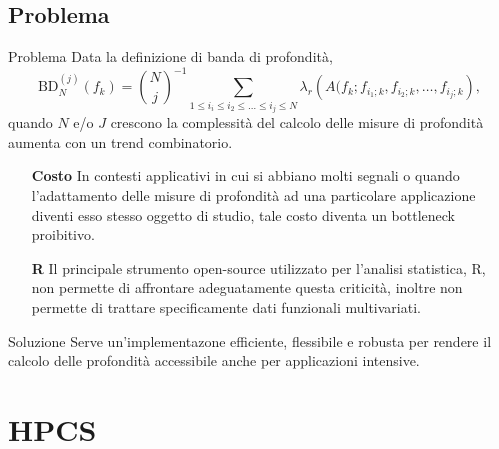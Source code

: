 \documentclass[9pt]{beamer}
\begin{document}
\subsection{Problema}
\begin{frame}

\begin{alertblock}{Problema}
Data la definizione di banda di profondit\`a,
\[
\text{BD}^{(j)}_N(f_k) = {N \choose j}^{-1} \sum_{1 \leq i_i \leq i_2 \leq \ldots \leq i_j \leq N } \lambda_r \left( A(f_k; f_{i_1;k}, f_{i_2;k}, \ldots, f_{i_j;k} \right),
\]
quando $N$ e/o $J$ crescono la complessit\`a del calcolo delle misure di profondit\`a
aumenta con un trend combinatorio.
\end{alertblock}

\begin{itemize}
 \item[\textbf{Costo}] In contesti applicativi in cui si abbiano molti segnali
	  o quando l’adattamento delle misure di profondità ad una particolare applicazione diventi esso stesso oggetto
	 di studio, tale costo diventa un bottleneck proibitivo.
\item[\textbf{R}] Il principale strumento open-source utilizzato per l'analisi statistica, R, non permette di affrontare adeguatamente questa criticità,
	  inoltre non permette di trattare specificamente dati funzionali multivariati.
\end{itemize}
\begin{block}{Soluzione}
Serve un'implementazone efficiente, flessibile e robusta per rendere il calcolo delle profondit\`a accessibile anche per applicazioni intensive.
\end{block}

\end{frame}



\section{HPCS}
\end{document}
